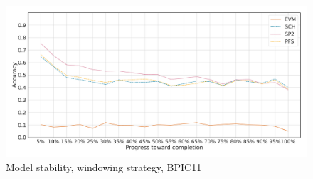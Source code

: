 \begin{figure}[!htb]
    \centering
    \includegraphics[width=\textwidth]{gfx/bpic2011/windowed_stability.pdf}
    \caption{Model stability, windowing strategy, BPIC11}
    \label{fig:bpic11-windowed-stability}
\end{figure}
\FloatBarrier

